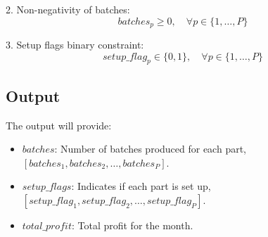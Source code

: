 \documentclass{article}
\begin{document}
2. Non-negativity of batches:
\[
batches_{p} \geq 0, \quad \forall p \in \{1, \ldots, P\}
\]

3. Setup flags binary constraint:
\[
setup\_flag_{p} \in \{0, 1\}, \quad \forall p \in \{1, \ldots, P\}
\]

\subsection*{Output}
The output will provide:
\begin{itemize}
    \item $batches$: Number of batches produced for each part, $[batches_{1}, batches_{2}, \ldots, batches_{P}]$.
    \item $setup\_flags$: Indicates if each part is set up, $[setup\_flag_{1}, setup\_flag_{2}, \ldots, setup\_flag_{P}]$.
    \item $total\_profit$: Total profit for the month.
\end{itemize}
\end{document}
